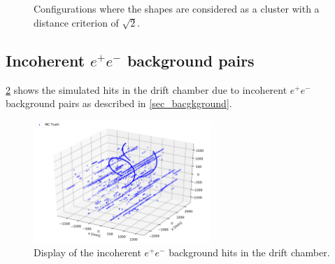 \begin{figure}[ht]
	\begin{framed}
	\centering
	\begin{subfigure}[b]{0.3\textwidth}
  \end{subfigure}
		~ %
	\centering
	\begin{subfigure}[b]{0.3\textwidth}
		\end{subfigure}
			~ %
	\centering
	\begin{subfigure}[b]{0.3\textwidth}
		\end{subfigure}
		\end{framed}

	\caption{Configurations where the shapes are considered as a cluster with a distance criterion of $\sqrt{2}$.}
	\label{fig_clushape}
\end{figure}


\subsection{Incoherent $e^+e^-$ background pairs}

\cref{fig_bcg} shows the simulated hits in the drift chamber due to incoherent $e^+e^-$ background pairs as described in \cref{sec_bacgkground}.

\begin{figure}[ht]
	\centering
	\includegraphics[width=0.6\textwidth]{figures/3D_background.pdf}%
	\caption{Display of the incoherent $e^+e^-$ background hits in the drift chamber.}
	\label{fig_bcg}
\end{figure}

